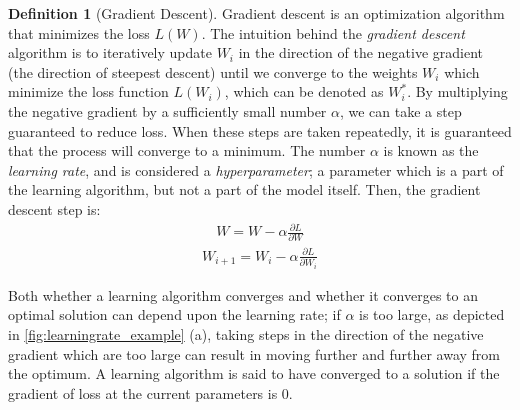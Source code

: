 \documentclass[11pt]{article}
\numberwithin{equation}{section}
\theoremstyle{definition}%
\newtheorem{definition}{Definition}[section]%
\newcommand{\Loss}{L}
\begin{document}
\begin{definition}[Gradient Descent]
    Gradient descent is an optimization algorithm that minimizes the loss $\Loss(W)$. The intuition behind the \emph{gradient descent} algorithm is to iteratively update $W_i$ in the direction of the negative gradient (the direction of steepest descent) until we converge to the weights $W_i$ which minimize the loss function $\Loss(W_i)$, which can be denoted as $W_i^{\ast}$. By multiplying the negative gradient by a sufficiently small number $\alpha$, we can take a step guaranteed to reduce loss. When these steps are taken repeatedly, it is guaranteed that the process will converge to a minimum. The number $\alpha$ is known as the \emph{learning rate}, and is considered a \emph{hyperparameter}; a parameter which is a part of the learning algorithm, but not a part of the model itself. Then, the gradient descent step is: 
    \begin{align}
        W = W - \alpha \frac{\partial \Loss}{\partial W}
    \end{align}
    \begin{align}
        W_{i + 1} = W_{i} - \alpha \frac{\partial \Loss}{\partial W_{i}}
    \end{align}
\end{definition}

Both whether a learning algorithm converges and whether it converges to an optimal solution can depend upon the learning rate; if $\alpha$ is too large, as depicted in \autoref{fig:learningrate_example} (a), taking steps in the direction of the negative gradient which are too large can result in moving further and further away from the optimum. A learning algorithm is said to have converged to a solution if the gradient of loss at the current parameters is 0.
\end{document}
